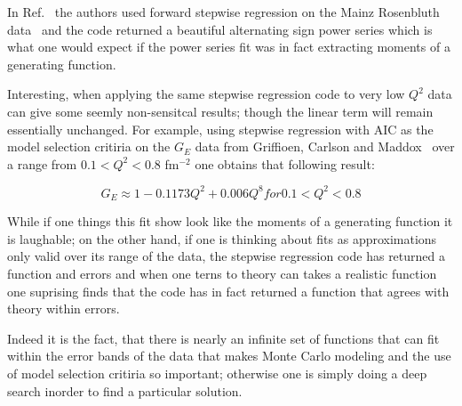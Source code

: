 \documentclass[10pt,aps,prc,twocolumn]{revtex4-1}
\begin{document}
\begin{appendix}
In Ref.~\cite{Higinbotham:2015rja} the authors used forward stepwise regression on the Mainz
Rosenbluth data~\cite{Bernauer:2010wm} and the code returned a beautiful alternating sign power 
series which is what one would expect if the power series fit was in fact extracting moments
of a generating function.   

Interesting, when applying the same stepwise regression code to very low $Q^2$ data can give
some seemly non-sensitcal results; though the linear term will remain essentially unchanged.   
For example, using stepwise regression with AIC as the
model selection critiria on the $G_E$ data from Griffioen, 
Carlson and Maddox~\cite{griffieon:2015 } over a range from $0.1 < Q^2 < 0.8$ fm$^{-2}$ one
obtains that following result:

\begin{equation}
G_E \approx 1 - 0.1173 Q^2 + 0.006 Q^8 for 0.1 < Q^2 < 0.8
\end{equation}

While if one things this fit show look like the moments of a generating function it is laughable; on the other
hand, if one is thinking about fits as approximations only valid over its range of the data, the stepwise
regression code has returned a function and errors and when one terns to theory can takes a realistic
function one suprising finds that the code has in fact returned a function that agrees with theory
within errors.

Indeed it is the fact, that there is nearly an infinite set of functions that can fit within the error bands
of the data that makes Monte Carlo modeling and the use of model selection critiria so important; otherwise
one is simply doing a deep search inorder to find a particular solution.

\end{appendix}


\end{document}
